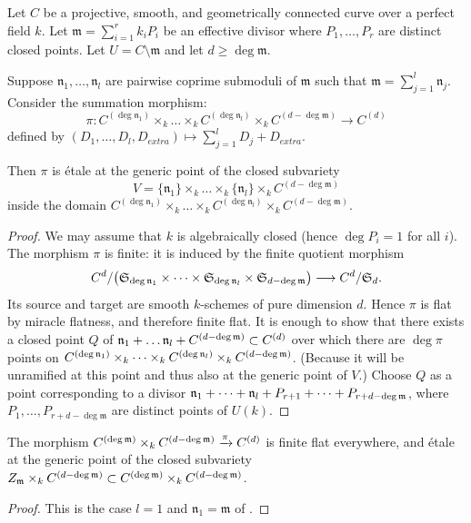 \begin{lemma}\label{lemma:takeuchi_lemma}
     Let $C$ be a projective, smooth, and geometrically connected curve over a perfect field $k$. 
     Let $\mathfrak{m} = \sum_{i=1}^{r} k_i P_i$ be an effective divisor where $P_1, \dots, P_r$ are distinct closed points. 
     Let $U = C \setminus \mathfrak{m}$ and let $d \geq \deg \mathfrak{m}$.

     Suppose $\mathfrak{n}_1, \dots, \mathfrak{n}_l$ are pairwise coprime submoduli of $\mathfrak{m}$ such that $\mathfrak{m} = \sum_{j=1}^l \mathfrak{n}_j$. 
     Consider the summation morphism:
     \[
     \pi : C^{(\deg \mathfrak{n}_1)} \times_k \dots \times_k C^{(\deg \mathfrak{n}_l)} \times_k C^{(d - \deg \mathfrak{m})} \longrightarrow C^{(d)}
     \]
     defined by $(D_1, \dots, D_l, D_{extra}) \mapsto \sum_{j=1}^l D_j + D_{extra}$.

     Then $\pi$ is étale at the generic point of the closed subvariety 
     \[
     V = \{\mathfrak{n}_1\} \times_k \dots \times_k \{\mathfrak{n}_l\} \times_k C^{(d - \deg \mathfrak{m})}
     \]
     inside the domain $C^{(\deg \mathfrak{n}_1)} \times_k \dots \times_k C^{(\deg \mathfrak{n}_l)} \times_k C^{(d - \deg \mathfrak{m})}$.

\begin{proof}
     We may assume that $k$ is algebraically closed (hence $\deg P_i = 1$ for all $i$).
     The morphism $\pi$ is finite: it is induced by the finite quotient morphism
     \[
     C^d/\bigl(\mathfrak S_{\deg\mathfrak{n}_1}\times\cdots\times
       \mathfrak S_{\deg\mathfrak{n}_l}\times
       \mathfrak S_{d-\deg\mathfrak{m}}\bigr)
       \longrightarrow C^d/\mathfrak S_d.
     \]
     Its source and target are smooth $k$-schemes of pure dimension $d$.
     Hence $\pi$ is flat by miracle flatness, and therefore finite flat.
     It is enough to show that there exists a closed point $Q$ of $\mathfrak{n}_1 + \dots \mathfrak{n}_l + C^{(d - \deg \mathfrak{m})} \subset C^{(d)}$ 
     over which there are $\deg \pi$ points on $C^{(\deg\mathfrak{n}_1)} \times_k \dots \times_k C^{(\deg\mathfrak{n}_l)} \times_k C^{(d - \deg \mathfrak{m})}$. (Because it will be unramified 
     at this point and thus also at the generic point of $V$.)
     Choose $Q$ as a point corresponding to a divisor
     $\mathfrak{n}_1 + \dots + \mathfrak{n}_l + P_{r+1} + \dots + P_{r+d - \deg \mathfrak{m}}$, where $P_1, \dots, P_{r+d - \deg \mathfrak{m}}$ are distinct points of $U(k)$.
\end{proof}     
\end{lemma}

\begin{cor}\label{cor:etale_at_generic_point}
     The morphism $C^{(\deg \mathfrak{m})} \times_k C^{(d - \deg \mathfrak{m})} \xrightarrow[]{\pi} C^{(d)}$
     is finite flat everywhere, and étale at the generic point of the closed subvariety
     $Z_{\mathfrak{m}} \times_k C^{(d - \deg \mathfrak{m})} \subset C^{(\deg \mathfrak{m})} \times_k C^{(d - \deg \mathfrak{m})}$.     
\end{cor}
\begin{proof}
This is the case $l=1$ and $\mathfrak n_1=\mathfrak m$ of .
\end{proof}

